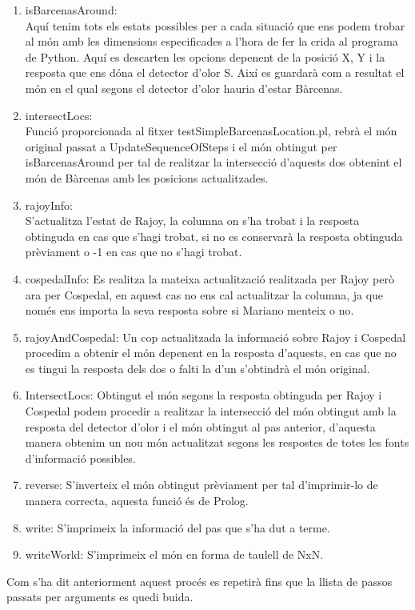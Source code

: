 \documentclass[11pt]{article}
\begin{document}
\begin{enumerate}
\item isBarcenasAround:\\
Aquí tenim tots els estats possibles per a cada situació que ens podem trobar al món amb les dimensions especificades a l'hora de fer la crida al programa de Python. Aquí es descarten les opcions depenent de la posició X, Y i la resposta que ens dóna el detector d'olor S. Així es guardarà com a resultat el món en el qual segons el detector d'olor hauria d'estar Bàrcenas.
\item intersectLocs:\\
Funció proporcionada al fitxer testSimpleBarcenasLocation.pl, rebrà el món original passat a UpdateSequenceOfSteps i el món obtingut per isBarcenasAround per tal de realitzar la intersecció d'aquests dos obtenint el món de Bàrcenas amb les posicions actualitzades.
\item rajoyInfo:\\
S'actualitza l'estat de Rajoy, la columna on s'ha trobat i la resposta obtinguda en cas que s'hagi trobat, si no es conservarà la resposta obtinguda prèviament o -1 en cas que no s'hagi trobat.
\item cospedalInfo:
Es realitza la mateixa actualització realitzada per Rajoy però ara per Cospedal, en aquest cas no ens cal actualitzar la columna, ja que només ens importa la seva resposta sobre si Mariano menteix o no.
\item rajoyAndCospedal:
Un cop actualitzada la informació sobre Rajoy i Cospedal procedim a obtenir el món depenent en la resposta d'aquests, en cas que no es tingui la resposta dels dos o falti la d'un s'obtindrà el món original.
\newpage
\item IntersectLocs:
Obtingut el món segons la resposta obtinguda per Rajoy i Cospedal podem procedir a realitzar la intersecció del món obtingut amb la resposta del detector d'olor i el món obtingut al pas anterior, d'aquesta manera obtenim un nou món actualitzat segons les respostes de totes les fonts d'informació possibles.
\item reverse:
S'inverteix el món obtingut prèviament per tal d'imprimir-lo de manera correcta, aquesta funció és de Prolog.
\item write:
S'imprimeix la informació del pas que s'ha dut a terme.
\item writeWorld:
S'imprimeix el món en forma de taulell de NxN.
\end{enumerate}
Com s'ha dit anteriorment aquest procés es repetirà fins que la llista de passos passats per arguments es quedi buida.
\end{document}
